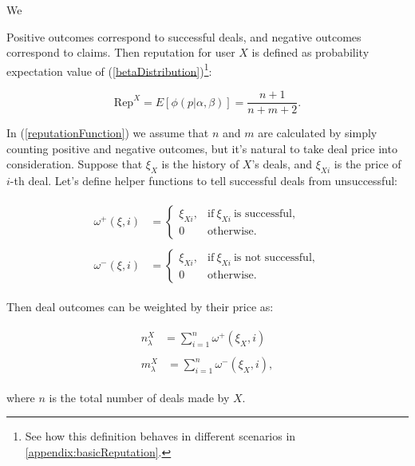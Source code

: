 \documentclass[11pt]{article}
\begin{document}
We 

Positive outcomes correspond to successful deals, and negative outcomes correspond to claims. Then  reputation for user $ X $ is defined as probability expectation value of (\ref{betaDistribution})\footnote{See how this definition behaves in different scenarios in \ref{appendix:basicReputation}.}:

\begin{equation} \label{reputationFunction}
\text{Rep}^{X} = E[\phi(p | \alpha, \beta)] = \frac{n + 1}{n + m + 2}.
\end{equation}

In (\ref{reputationFunction}) we assume that $ n $ and $ m $ are calculated by simply counting positive and negative outcomes, but it's natural to take deal price into consideration. Suppose that $ \xi_{X} $ is the history of $ X $'s deals, and $ \xi_{Xi} $ is the price of $ i $-th deal. Let's define helper functions to tell successful deals from unsuccessful:

\begin{align}
\begin{split}
\omega^{+}(\xi, i) {}& = \begin{cases} \xi_{Xi}, & \text{if}\ \xi_{Xi}\ \mbox{is successful}, \\ 0 & \mbox{otherwise.} \end{cases}
\end{split} \\
\begin{split}
\omega^{-}(\xi, i) {}& = \begin{cases} \xi_{Xi}, & \text{if}\ \xi_{Xi}\ \mbox{is not successful}, \\ 0 & \mbox{otherwise.} \end{cases}
\end{split}
\end{align}

Then deal outcomes can be weighted by their price as:

\begin{align}
\begin{split}
n_{\lambda}^{X} {}& = \sum_{i = 1}^{n} \omega^{+}(\xi_X, i)
\end{split} \\
\begin{split}
m_{\lambda}^{X} {}& = \sum_{i = 1}^{n} \omega^{-}(\xi_X, i),
\end{split}
\end{align}

where $ n $ is the total number of deals made by $ X $.
\end{document}
